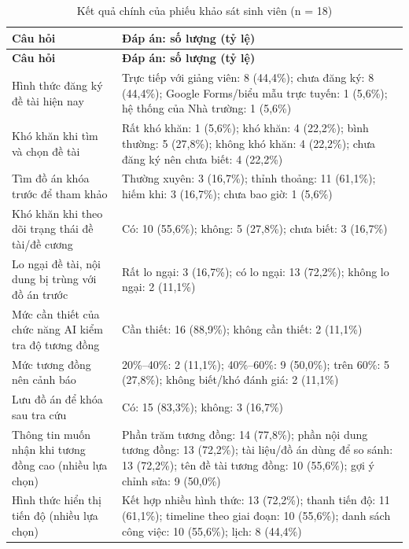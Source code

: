 \documentclass[../main.tex]{subfiles}
\begin{document}
{\renewcommand{\arraystretch}{1.2}
\begin{longtable}{|p{4.6cm}|p{10.4cm}|}
\caption{Kết quả chính của phiếu khảo sát sinh viên (n = 18)}\label{tab:c2-ks-hien-trang}\\
\hline
\textbf{Câu hỏi} & \textbf{Đáp án: số lượng (tỷ lệ)} \\
\hline
\endfirsthead
\hline
\textbf{Câu hỏi} & \textbf{Đáp án: số lượng (tỷ lệ)} \\
\hline
\endhead
Hình thức đăng ký đề tài hiện nay & Trực tiếp với giảng viên: 8 (44,4\%); chưa đăng ký: 8 (44,4\%); Google Forms/biểu mẫu trực tuyến: 1 (5,6\%); hệ thống của Nhà trường: 1 (5,6\%) \\
\hline
Khó khăn khi tìm và chọn đề tài & Rất khó khăn: 1 (5,6\%); khó khăn: 4 (22,2\%); bình thường: 5 (27,8\%); không khó khăn: 4 (22,2\%); chưa đăng ký nên chưa biết: 4 (22,2\%) \\
\hline
Tìm đồ án khóa trước để tham khảo & Thường xuyên: 3 (16,7\%); thỉnh thoảng: 11 (61,1\%); hiếm khi: 3 (16,7\%); chưa bao giờ: 1 (5,6\%) \\
\hline
Khó khăn khi theo dõi trạng thái đề tài/đề cương & Có: 10 (55,6\%); không: 5 (27,8\%); chưa biết: 3 (16,7\%) \\
\hline
Lo ngại đề tài, nội dung bị trùng với đồ án trước & Rất lo ngại: 3 (16,7\%); có lo ngại: 13 (72,2\%); không lo ngại: 2 (11,1\%) \\
\hline
Mức cần thiết của chức năng AI kiểm tra độ tương đồng & Cần thiết: 16 (88,9\%); không cần thiết: 2 (11,1\%) \\
\hline
Mức tương đồng nên cảnh báo & 20\%--40\%: 2 (11,1\%); 40\%--60\%: 9 (50,0\%); trên 60\%: 5 (27,8\%); không biết/khó đánh giá: 2 (11,1\%) \\
\hline
Lưu đồ án để khóa sau tra cứu & Có: 15 (83,3\%); không: 3 (16,7\%) \\
\hline
Thông tin muốn nhận khi tương đồng cao (nhiều lựa chọn) & Phần trăm tương đồng: 14 (77,8\%); phần nội dung tương đồng: 13 (72,2\%); tài liệu/đồ án dùng để so sánh: 13 (72,2\%); tên đề tài tương đồng: 10 (55,6\%); gợi ý chỉnh sửa: 9 (50,0\%) \\
\hline
Hình thức hiển thị tiến độ (nhiều lựa chọn) & Kết hợp nhiều hình thức: 13 (72,2\%); thanh tiến độ: 11 (61,1\%); timeline theo giai đoạn: 10 (55,6\%); danh sách công việc: 10 (55,6\%); lịch: 8 (44,4\%) \\
\hline
\end{longtable}
}
\end{document}
